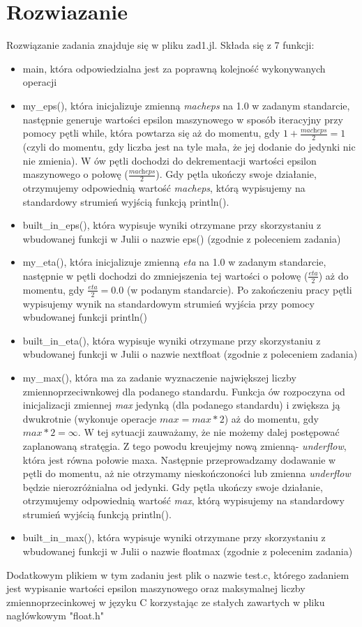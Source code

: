 \documentclass[a4paper,14pt]{report}
\begin{document}
\section{Rozwiazanie}
Rozwiązanie zadania znajduje się w pliku zad1.jl. Składa się z 7 funkcji:
\begin{itemize}
  \item main, która odpowiedzialna jest za poprawną kolejność wykonywanych operacji
  \item my\_eps(), która inicjalizuje zmienną \textit{macheps} na 1.0 w zadanym standarcie, następnie generuje wartości epsilon maszynowego w sposób iteracyjny przy pomocy pętli while, która powtarza się aż do momentu, gdy $1+\frac{\textit{macheps}}{2} = 1$ (czyli do momentu, gdy liczba jest na tyle mała, że jej dodanie do jedynki nic nie zmienia). W ów pętli dochodzi do dekrementacji wartości epsilon maszynowego o połowę ($\frac{\textit{macheps}}{2}$).
  Gdy pętla ukończy swoje działanie, otrzymujemy odpowiednią wartość \textit{macheps}, którą wypisujemy na standardowy strumień wyjścią funkcją println().
  \item built\_in\_eps(), która wypisuje wyniki otrzymane przy skorzystaniu z wbudowanej funkcji w Julii o nazwie eps() (zgodnie z poleceniem zadania)
  \item my\_eta(), która inicjalizuje zmienną \textit{eta} na 1.0 w zadanym standarcie, następnie w pętli dochodzi do zmniejszenia tej wartości o połowę ($ \frac{\textit{eta}}{2}$) aż do momentu, gdy $ \frac{\textit{eta}}{2} = 0.0 $ (w podanym standarcie). Po zakończeniu pracy pętli wypisujemy wynik na standardowym strumień wyjścia przy pomocy wbudowanej funkcji println()
  \item built\_in\_eta(), która wypisuje wyniki otrzymane przy skorzystaniu z wbudowanej funkcji w Julii o nazwie nextfloat (zgodnie z poleceniem zadania)
  \item my\_max(), która ma za zadanie wyznaczenie największej liczby zmiennoprzeciwnkowej dla podanego standardu. Funkcja ów rozpoczyna od inicjalizacji zmiennej \textit{max} jedynką (dla podanego standardu) i zwiększa ją dwukrotnie (wykonuje operacje $ \textit{max}=\textit{max}*2 $) aż do momentu, gdy $\textit{max}*2 = \infty $. W tej sytuacji zauważamy, że nie możemy dalej postępować zaplanowaną stratęgia. Z tego powodu kreujejmy nową zmienną-  \textit{underflow}, która jest równa połowie maxa. Następnie przeprowadzamy dodawanie w pętli do momentu, aż nie otrzymamy nieskończoności lub zmienna \textit{underflow} będzie nierozróżnialna od jedynki. Gdy pętla ukończy swoje działanie, otrzymujemy odpowiednią wartość \textit{max}, którą wypisujemy na standardowy strumień wyjścią funkcją println().
  \item built\_in\_max(), która wypisuje wyniki otrzymane przy skorzystaniu z wbudowanej funkcji w Julii o nazwie floatmax (zgodnie z polecenim zadania)
\end{itemize}
Dodatkowym plikiem w tym zadaniu jest plik o nazwie test.c, którego zadaniem jest wypisanie wartości epsilon maszynowego oraz maksymalnej liczby zmiennoprzecinkowej w języku C korzystając ze stałych zawartych w pliku nagłówkowym "float.h"
\end{document}
